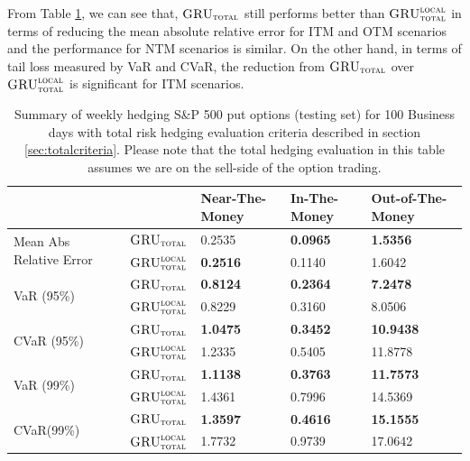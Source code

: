 \documentclass[letterpaper,12pt,titlepage,oneside,final]{book}
\numberwithin{equation}{section}
\theoremstyle{definition}
\newcommand{\modelT}{\textsc{GRU}_{\textsc{total}}}
\newcommand{\modelL}{\textsc{GRU}_{\textsc{total}}^{\textsc{local}}}
\begin{document}
From Table \ref{table:AppputTotalW},  we can see that, $\modelT$ still performs better than $\modelL$ in terms of reducing the mean absolute relative error for ITM and OTM scenarios and the performance for NTM scenarios is similar. On the other hand, in terms of tail loss measured by VaR and CVaR, the reduction from $\modelT$ over $\modelL$ is significant for ITM scenarios.
\begin{table}[htp!]
	\centering
	\begin{tabular}{ll|l|l|l|}
		\cline{3-5}
		&          & Near-The-Money   & In-The-Money     & Out-of-The-Money  \\ \hline
		\multicolumn{1}{|l|}{\multirow{2}{*}{Mean Abs Relative Error}} & $\modelT$    & 0.2535  & \textbf{0.0965}  & \textbf{1.5356}   \\ 
		\multicolumn{1}{|l|}{}                                & $\modelL$    & \textbf{0.2516}  & 0.1140           & 1.6042             
         \\ 
		\hline
		\multicolumn{1}{|l|}{\multirow{2}{*}{VaR (95\%)}}     & $\modelT$    & \textbf{0.8124} & \textbf{0.2364} & \textbf{7.2478}  \\ 
		\multicolumn{1}{|l|}{}                                & $\modelL$    & 0.8229          & 0.3160          & 8.0506           \\            
		\hline
		\multicolumn{1}{|l|}{\multirow{2}{*}{CVaR (95\%)}}    & $\modelT$    & \textbf{1.0475} & \textbf{0.3452} & \textbf{10.9438} \\ 
		\multicolumn{1}{|l|}{}                                & $\modelL$    & 1.2335          & 0.5405          & 11.8778          \\  
		\hline
		\multicolumn{1}{|l|}{\multirow{2}{*}{VaR (99\%)}}     & $\modelT$    & \textbf{1.1138} & \textbf{0.3763} & \textbf{11.7573} \\  
		\multicolumn{1}{|l|}{}                                & $\modelL$    & 1.4361          & 0.7996          & 14.5369           \\ 
		\hline
		\multicolumn{1}{|l|}{\multirow{2}{*}{CVaR(99\%)}}     & $\modelT$    & \textbf{1.3597} & \textbf{0.4616} & \textbf{15.1555} \\  
		\multicolumn{1}{|l|}{}                                & $\modelL$    & 1.7732          & 0.9739          & 17.0642         \\ 
 \hline
	\end{tabular}
	\caption{Summary of weekly hedging S\&P 500 put options (testing set) for 100 Business days with total risk hedging evaluation criteria described in section \ref{sec:totalcriteria}. Please note that the total hedging evaluation in this table assumes we are on the sell-side of the option trading.} \label{table:AppputTotalW}
\end{table}
\end{document}
